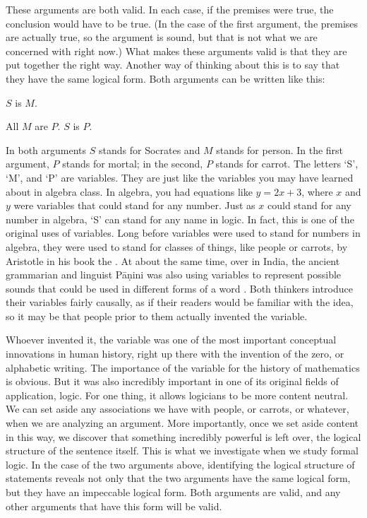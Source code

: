 These arguments are both valid. In each case, if the premises were true, the conclusion would have to be true. (In the case of the first argument, the premises are actually true, so the argument is sound, but that is not what we are concerned with right now.) What makes these arguments valid is that they are put together the right way. Another way of thinking about this is to say that they have the same logical form. Both arguments can be written like this:

\begin{earg*}
\item $S$ is $M$.
\item All $M$ are $P$.
\itemc[.2] $S$ is $P$.
\end{earg*}

In both arguments $S$ stands for Socrates and $M$ stands for person. In the first argument, $P$ stands for mortal; in the second, $P$ stands for carrot.  The letters `S', `M', and `P' are variables. They are just like the variables you may have learned about in algebra class. In algebra, you had equations like $y = 2x + 3$, where $x$ and $y$ were variables that could stand for any number. Just as $x$ could stand for any number in algebra, `S' can stand for any name in logic. In fact, this is one of the original uses of variables. Long before variables were used to stand for numbers in algebra, they were used to stand for classes of things, like people or carrots, by Aristotle in his book the \cite*{Aristotle:prior}. At about the same time, over in India, the ancient grammarian and linguist P\={a}\d{n}ini was also using variables to represent possible sounds that could be used in different forms of a word \citep{Panini2015}. Both thinkers introduce their variables fairly causally, as if their readers would be familiar with the idea, so it may be that people prior to them actually invented the variable.

Whoever invented it, the variable was one of the most important conceptual innovations in human history, right up there with the invention of the zero, or alphabetic writing. The importance of the variable for the history of mathematics is obvious. But it was also incredibly important in one of its original fields of application, logic. For one thing, it allows logicians to be more content neutral. We can set aside any associations we have with people, or carrots, or whatever, when we are analyzing an argument. More importantly, once we set aside content in this way, we discover that something incredibly powerful is left over, the logical structure of the sentence itself. This is what we investigate when we study formal logic. In the case of the two arguments above, identifying the logical structure of statements reveals not only that the two arguments have the same logical form, but they have an impeccable logical form. Both arguments are valid, and any other arguments that have this form will be valid. 

